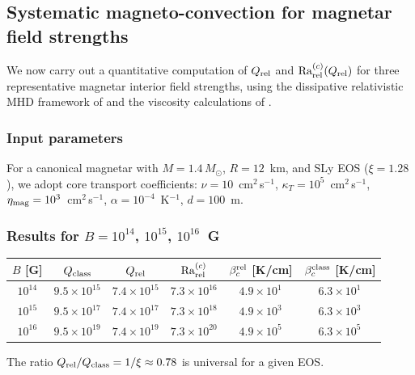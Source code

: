 
\subsection*{Systematic magneto-convection for magnetar field strengths}

We now carry out a quantitative computation of $Q_{\mathrm{rel}}$ and
$\mathrm{Ra}_{\mathrm{rel}}^{(c)}(Q_{\mathrm{rel}})$ for three representative magnetar interior
field strengths, using the dissipative relativistic MHD framework
of \citet{MostNoronha2021} and the viscosity calculations of
\citet{CamelioEtAl2023}.

\subsubsection*{Input parameters}

For a canonical magnetar with $M = 1.4\,M_\odot$, $R = 12$~km, and
SLy EOS ($\xi = 1.28$), we adopt core transport coefficients:
$\nu = 10$~cm$^2$\,s$^{-1}$,
$\kappa_T = 10^5$~cm$^2$\,s$^{-1}$,
$\eta_{\rm mag} = 10^3$~cm$^2$\,s$^{-1}$,
$\alpha = 10^{-4}$~K$^{-1}$, $d = 100$~m.

\subsubsection*{Results for $B = 10^{14}$, $10^{15}$, $10^{16}$~G}

\begin{center}
\begin{tabular}{cccccc}
\hline
$B$ [G] & $Q_{\rm class}$ & $Q_{\mathrm{rel}}$ & $\mathrm{Ra}_{\mathrm{rel}}^{(c)}$
  & $\beta_c^{\rm rel}$ [K/cm] & $\beta_c^{\rm class}$ [K/cm] \\
\hline
$10^{14}$ & $9.5\times 10^{15}$ & $7.4\times 10^{15}$
  & $7.3\times 10^{16}$ & $4.9\times 10^{1}$ & $6.3\times 10^{1}$ \\
$10^{15}$ & $9.5\times 10^{17}$ & $7.4\times 10^{17}$
  & $7.3\times 10^{18}$ & $4.9\times 10^{3}$ & $6.3\times 10^{3}$ \\
$10^{16}$ & $9.5\times 10^{19}$ & $7.4\times 10^{19}$
  & $7.3\times 10^{20}$ & $4.9\times 10^{5}$ & $6.3\times 10^{5}$ \\
\hline
\end{tabular}
\end{center}

The ratio $Q_{\mathrm{rel}}/Q_{\rm class} = 1/\xi \approx 0.78$ is universal for
a given EOS.

